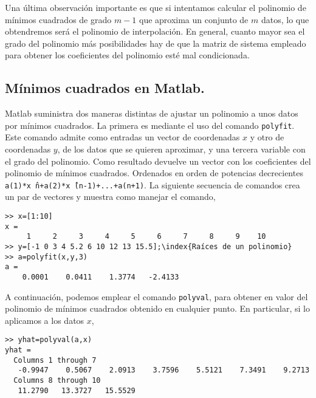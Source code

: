 Una última observación importante es que si intentamos calcular el polinomio de mínimos cuadrados de grado $m-1$ que aproxima un conjunto de $m$ datos, lo que obtendremos será el polinomio de interpolación. En general, cuanto mayor sea el grado del polinomio más posibilidades hay de que la matriz de sistema empleado para obtener los coeficientes del polinomio esté mal condicionada.

\subsection{Mínimos cuadrados en Matlab.}

Matlab suministra dos maneras distintas de ajustar un polinomio a unos datos por mínimos cuadrados. La primera es mediante el uso del comando \texttt{polyfit}. Este comando admite como entradas un vector de coordenadas $x$ y otro de coordenadas $y$, de los datos que se quieren aproximar, y una tercera variable con el grado del polinomio. Como resultado devuelve un vector con los coeficientes del polinomio de mínimos cuadrados. Ordenados en orden de potencias decrecientes \texttt{a(1)*x\^\  n+a(2)*x\^\  (n-1)+...+a(n+1)}. La siguiente secuencia de comandos crea un par de vectores y muestra como manejar el comando,



\begin{verbatim}>> x=[1:10]
x =
     1     2     3     4     5     6     7     8     9    10
>> y=[-1 0 3 4 5.2 6 10 12 13 15.5];\index{Raíces de un polinomio}
>> a=polyfit(x,y,3)
a =
    0.0001    0.0411    1.3774   -2.4133
\end{verbatim}
A continuación, podemos emplear el comando \texttt{polyval}, para obtener en valor del polinomio de mínimos cuadrados obtenido en cualquier punto. En particular, si lo aplicamos a los datos $x$,

\begin{verbatim}
>> yhat=polyval(a,x)
yhat =
  Columns 1 through 7
   -0.9947    0.5067    2.0913    3.7596    5.5121    7.3491    9.2713
  Columns 8 through 10
   11.2790   13.3727   15.5529
\end{verbatim}

